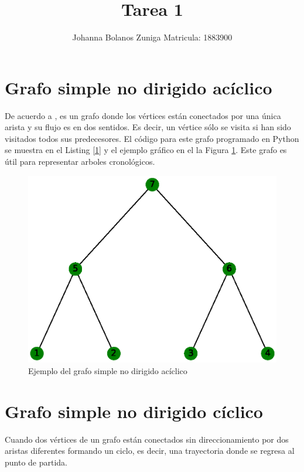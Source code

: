 \documentclass{article}
\title{Tarea 1}
\author{Johanna Bolanos Zuniga Matricula: 1883900}
\date{} %
\begin{document}
\maketitle %

\section{Grafo simple no dirigido acíclico}
De acuerdo a \cite{Ahuja2017}, es un grafo donde los vértices están conectados por una única arista y su flujo es en dos sentidos. Es decir, un vértice sólo se visita si han sido visitados todos sus predecesores. El código para este grafo programado en Python se muestra en el Listing \ref{1} y el ejemplo gráfico en el la Figura \ref{fig:g1}. Este grafo es útil para representar arboles cronológicos.

\label{1}
 


\begin{figure}[htp]
\centering
\includegraphics[scale=0.4]{g1.eps}
\caption{Ejemplo del grafo simple no dirigido acíclico}
\label{fig:g1}
\end{figure}


\section{Grafo simple no dirigido cíclico}
Cuando dos vértices de un grafo están conectados sin direccionamiento por dos aristas diferentes formando un ciclo, es decir, una trayectoria donde se regresa al punto de partida.
\end{document}
